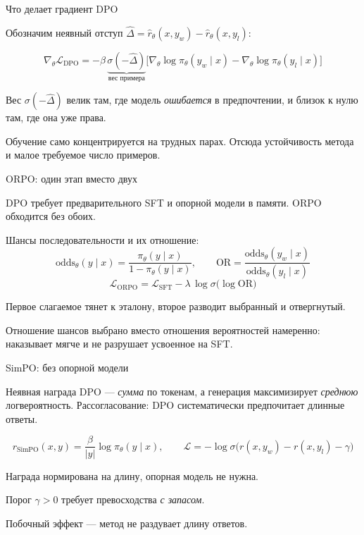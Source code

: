 \documentclass[11pt,aspectratio=169]{beamer}
\newcommand{\key}[1]{%
  \begin{center}\colorbox{boxbg}{\parbox{0.92\textwidth}{\vspace{2pt}#1\vspace{2pt}}}\end{center}}
\newcommand{\aside}[1]{{\color{dim}\small #1}}
\begin{document}
\begin{frame}{Что делает градиент DPO}

Обозначим неявный отступ
$\hat\Delta = \hat r_\theta(x,y_w) - \hat r_\theta(x,y_l)$:

\vspace{0.5em}
\[
\nabla_\theta \mathcal{L}_{\text{DPO}} = -\beta\,
\underbrace{\sigma(-\hat\Delta)}_{\text{вес примера}}
\Big[\nabla_\theta\log\pi_\theta(y_w\mid x)
- \nabla_\theta\log\pi_\theta(y_l\mid x)\Big]
\]

\vspace{1em}
Вес $\sigma(-\hat\Delta)$ велик там, где модель \emph{ошибается}
в предпочтении, и близок к нулю там, где она уже права.

\vspace{0.8em}
\key{Обучение само концентрируется на трудных парах. Отсюда
устойчивость метода и малое требуемое число примеров.}

\end{frame}

\begin{frame}{ORPO: один этап вместо двух}

DPO требует предварительного SFT и опорной модели в памяти. ORPO
обходится без обоих.

\vspace{0.8em}
Шансы последовательности и их отношение:
\[
\text{odds}_\theta(y\mid x) = \frac{\pi_\theta(y\mid x)}{1-\pi_\theta(y\mid x)},
\qquad
\text{OR} = \frac{\text{odds}_\theta(y_w\mid x)}{\text{odds}_\theta(y_l\mid x)}
\]
\[
\mathcal{L}_{\text{ORPO}} = \mathcal{L}_{\text{SFT}}
- \lambda\,\log\sigma\big(\log \text{OR}\big)
\]

\vspace{0.5em}
Первое слагаемое тянет к эталону, второе разводит выбранный
и отвергнутый.

\vspace{0.5em}
\aside{Отношение шансов выбрано вместо отношения вероятностей намеренно:
наказывает мягче и не разрушает усвоенное на SFT.}

\end{frame}

\begin{frame}{SimPO: без опорной модели}

Неявная награда DPO — \emph{сумма} по токенам, а генерация
максимизирует \emph{среднюю} логвероятность. Рассогласование:
DPO систематически предпочитает длинные ответы.

\vspace{0.8em}
\[
r_{\text{SimPO}}(x,y) = \frac{\beta}{|y|}\log\pi_\theta(y\mid x),
\qquad
\mathcal{L} = -\log\sigma\big(r(x,y_w) - r(x,y_l) - \gamma\big)
\]

\vspace{0.5em}
Награда нормирована на длину, опорная модель не нужна.

\vspace{0.5em}
Порог $\gamma > 0$ требует превосходства \emph{с запасом}.

\vspace{0.5em}
\aside{Побочный эффект — метод не раздувает длину ответов.}

\end{frame}
\end{document}
